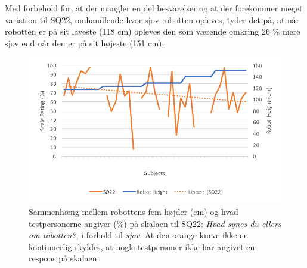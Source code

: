 \noindent
%
Med forbehold for, at der mangler en del besvarelser og at der forekommer meget variation til SQ22, omhandlende hvor sjov robotten opleves, tyder det på, at når robotten er på sit laveste (118 cm) opleves den som værende omkring 26 \% mere sjov end når den er på sit højeste (151 cm).
%
\begin{figure}[H]
\centering
\includegraphics[width=\textwidth]{Figure/DatabehandlingSkalaer/TendensHeight/HeightSQ22}
\caption{Sammenhæng mellem robottens fem højder (cm) og hvad testpersonerne angiver (\%) på skalaen til SQ22: \textit{Hvad synes du ellers om robotten?}, i forhold til \textit{sjov}. At den orange kurve ikke er kontinuerlig skyldes, at nogle testpersoner ikke har angivet en respons på skalaen.}
\label{fig:TendensHeightSQ22}
\end{figure}
\noindent
%